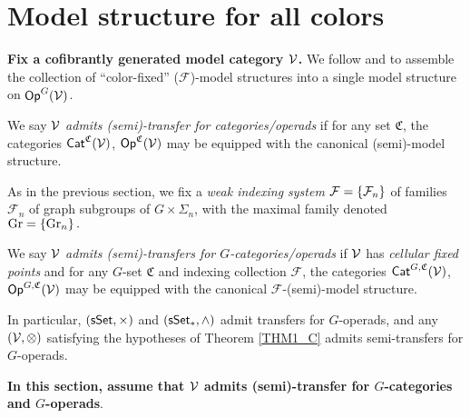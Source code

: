 \documentclass[a4paper,10pt
,draft
]{article}%
\renewcommand{\F}{\mathcal F}
\renewcommand{\1}{\ensuremath{\mathbb{id}}}
\begin{document}
\newpage

\section{Model structure for all colors} 
\renewcommand{\C}{\mathfrak C}

\textbf{Fix a cofibrantly generated model category $\mathcal V$.}
We follow \cite{BM13} and \cite{Cav14} to assemble the collection of ``color-fixed''
($\F$)-model structures into
a single model structure on $\mathsf{Op}^G(\mathcal V)$.


\begin{definition}
      We say $\mathcal V$ \textit{admits (semi)-transfer for categories/operads} if for any set $\mathfrak C$,
      the categories $\mathsf{Cat}^{\mathfrak C}(\mathcal V)$, $\mathsf{Op}^{\mathfrak C}(\mathcal V)$
      may be equipped with the canonical (semi)-model structure.
\end{definition}

As in the previous section, we fix a \textit{weak indexing system} $\F = \set{\F_n}$ of families $\F_n$ of graph subgroups of $G \times \Sigma_n$,
with the maximal family denoted $\mathrm{Gr} = \left\{\mathrm{Gr}_n\right\}.$

\begin{definition}
      We say $\mathcal V$ \textit{admits (semi)-transfers for $G$-categories/operads} if
      $\mathcal V$ has \textit{cellular fixed points} and
      for any $G$-set $\mathfrak C$ and indexing collection $\F$,
      the categories $\mathsf{Cat}^{G, \mathfrak C}(\mathcal V)$, $\mathsf{Op}^{G, \mathfrak C}(\mathcal V)$
      may be equipped with the canonical $\F$-(semi)-model structure.
\end{definition}

\begin{remark}
      In particular, $(\mathsf{sSet}, \times)$ and $(\sSet_{\**}, \wedge)$ admit transfers for $G$-operads,
      and any $(\mathcal V, \otimes)$ satisfying the hypotheses of Theorem \ref{THM1_C} admits semi-transfers for $G$-operads.
\end{remark}

\textbf{\color{OliveGreen} In this section, assume that $\mathcal V$ admits (semi)-transfer for $G$-categories and $G$-operads}.
\end{document}
